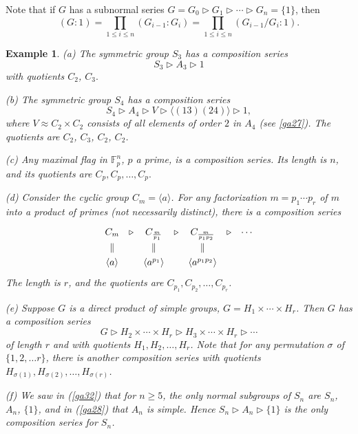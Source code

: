 \documentclass[a4paper,11pt,final,openany]{memoir}%
\newtheorem{example}[X]{Example}
\theoremstyle{nonumberplain}
\begin{document}
Note that if $G$ has a subnormal series $G=G_{0}\triangleright G_{1}%
\triangleright\cdots\triangleright G_{n}=\{1\}$, then
\[
(G:1)=\prod_{1\leq i\leq n}(G_{i-1}:G_{i})=\prod_{1\leq i\leq n}(G_{i-1}%
/G_{i}:1).
\]


\begin{example}
\label{ns01}(a) The symmetric group $S_{3}$ has a composition series
\[
S_{3}\triangleright A_{3}\triangleright1
\]
with quotients $C_{2}$, $C_{3}.$

(b) The symmetric group $S_{4}$ has a composition series
\[
S_{4}\triangleright A_{4}\triangleright V\triangleright\langle(13)(24)\rangle
\triangleright1,
\]
where $V\approx C_{2}\times C_{2}$ consists of all elements of order $2$ in
$A_{4}$ (see \ref{ga27}). The quotients are $C_{2}$, $C_{3}$, $C_{2}$, $C_{2}$.

(c) Any maximal flag in $\mathbb{F}_{p}^{n}$, $p$ a prime, is a composition
series. Its length is $n$, and its quotients are $C_{p},C_{p},\ldots,C_{p}.$

(d) Consider the cyclic group $C_{m}=\langle a\rangle$. For any factorization
$m=p_{1}\cdots p_{r}$ of $m$ into a product of primes (not necessarily
distinct), there is a composition series
\[
\renewcommand{\arraystretch}{1.3}
\begin{array}
[c]{ccccccc}%
C_{m} & \triangleright & C_{\frac{m}{p_{1}}} & \triangleright & C_{\frac
{m}{p_{1}p_{2}}} & \triangleright & \cdots\\
\Vert &  & \Vert &  & \Vert &  & \\
\langle a\rangle &  & \langle a^{p_{1}}\rangle &  & \langle a^{p_{1}p_{2}%
}\rangle &  &
\end{array}
\]
The length is $r$, and the quotients are $C_{p_{1}},C_{p_{2}},\ldots,C_{p_{r}%
}$.

(e) Suppose $G$ is a direct product of simple groups, $G=H_{1}\times
\cdots\times H_{r}$. Then $G$ has a composition series
\[
G\triangleright H_{2}\times\cdots\times H_{r}\triangleright H_{3}\times
\cdots\times H_{r}\triangleright\cdots
\]
of length $r$ and with quotients $H_{1},H_{2},\ldots,H_{r}$. Note that for any
permutation $\sigma$ of $\{1,2,\ldots r\}$, there is another composition
series with quotients $H_{\sigma(1)},H_{\sigma(2)},\ldots,H_{\sigma(r)}$.

(f) We saw in (\ref{ga32}) that for $n\geq5$, the only normal subgroups of
$S_{n}$ are $S_{n}$, $A_{n}$, $\{1\}$, and in (\ref{ga28}) that $A_{n}$ is
simple. Hence $S_{n}\triangleright A_{n}\triangleright\{1\}$ is the
\textit{only}\emph{\/} composition series for $S_{n}$.
\end{example}
\end{document}
